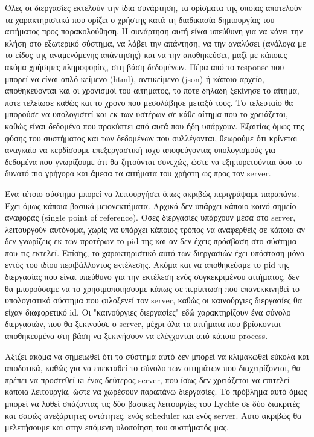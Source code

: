 Όλες οι διεργασίες εκτελούν την ίδια συνάρτηση, τα ορίσματα της οποίας αποτελούν τα χαρακτηριστικά που ορίζει ο χρήστης
κατά τη διαδικασία δημιουργίας του αιτήματος προς παρακολούθηση. Η συνάρτηση αυτή είναι υπεύθυνη για να κάνει την κλήση στο εξωτερικό
σύστημα, να λάβει την απάντηση, να την αναλύσει (ανάλογα με το είδος της αναμενόμενης απάντησης) και να την αποθηκεύσει,
μαζί με κάποιες ακόμα χρήσιμες πληροφορίες, στη βάση δεδομένων. Πέρα από το response που μπορεί να είναι απλό κείμενο (html), αντικείμενο (json) ή κάποιο
αρχείο, αποθηκεύονται και οι χρονισμοί του αιτήματος, το πότε δηλαδή ξεκίνησε το αίτημα, πότε τελείωσε καθώς και το χρόνο που μεσολάβησε μεταξύ τους. Το τελευταίο
θα μπορούσε να υπολογιστεί και εκ των υστέρων σε κάθε αίτημα που το χρειάζεται, καθώς είναι δεδομένο που προκύπτει από αυτά που ήδη υπάρχουν.
Εξαιτίας όμως της φύσης του συστήματος και των δεδομένων που συλλέγονται,
θεωρούμε ότι κρίνεται αναγκαίο να κερδίσουμε επεξεργαστική ισχύ αποφεύγοντας υπολογισμούς
για δεδομένα που γνωρίζουμε ότι θα ζητούνται συνεχώς, ώστε να εξηπυρετούνται όσο το δυνατό
πιο γρήγορα και άμεσα τα αιτήματα του χρήστη ως προς τον server.

Ένα τέτοιο σύστημα μπορεί να λειτουργήσει όπως ακριβώς περιγράψαμε παραπάνω. Έχει όμως κάποια βασικά μειονεκτήματα.
Αρχικά δεν υπάρχει κάποιο κοινό σημείο αναφοράς (single point of reference). Όσες διεργασίες υπάρχουν μέσα στο server, λειτουργούν αυτόνομα,
χωρίς να υπάρχει κάποιος τρόπος να αναφερθείς σε κάποια αν δεν γνωρίζεις εκ των προτέρων το pid της και αν δεν έχεις πρόσβαση
στο σύστημα που τις εκτελεί. Επίσης, το χαρακτηριστικό αυτό των διεργασιών έχει υπόσταση μόνο εντός του ιδίου περιβάλλοντος εκτέλεσης. Ακόμα και
να αποθηκεύαμε το pid της διεργασίας που είναι υπεύθυνο για την εκτέλεση ενός συγκεκριμένου αιτήματος, δεν θα μπορούσαμε να το χρησιμοποιήσουμε
κάπως σε περίπτωση που επανεκκινηθεί το υπολογιστικό σύστημα που φιλοξενεί τον server, καθώς οι καινούργιες διεργασίες θα είχαν διαφορετικό id.
Οι "καινούργιες διεργασίες" εδώ χαρακτηρίζουν ένα σύνολο διεργασιών, που θα ξεκινούσε ο server, μέχρι όλα τα αιτήματα που βρίσκονται αποθηκευμένα στη βάση
να ξεκινήσουν να ελέγχονται από κάποιο process.

Αξίζει ακόμα να σημειωθεί ότι το σύστημα αυτό δεν μπορεί να κλιμακωθεί εύκολα και αποδοτικά, καθώς
για να επεκταθεί το σύνολο των αιτημάτων που διαχειρίζονται, θα πρέπει να προστεθεί κι ένας δεύτερος server, που ίσως δεν χρειάζεται να επιτελεί κάποια λειτουργία,
ώστε να χωρέσουν παραπάνω διεργασίες. Το πρόβλημα αυτό όμως μπορεί να λυθεί σπάζοντας τις δύο βασικές λειτουργίες του
Lychte σε δύο διακριτές και σαφώς ανεξάρτητες οντότητες, ενός scheduler και ενός server. Αυτό ακριβώς θα μελετήσουμε και στην επόμενη υλοποίηση του συστήματός μας.

